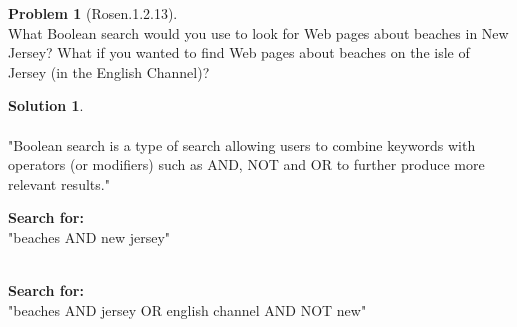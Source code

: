 \documentclass{article}
\theoremstyle{definition}
\newtheorem*{problem}{Problem}
\newtheorem*{solution}{Solution}
\begin{document}
\begin{problem}[Rosen.1.2.13]\ \\
What Boolean search would you use to look for Web
pages about beaches in New Jersey? What if you wanted
to find Web pages about beaches on the isle of Jersey (in
the English Channel)?
\begin{compactenum}
\renewcommand{\theenumi}{\alph{enumi}}

\end{compactenum}
\end{problem}

\begin{solution}\ \\
\ \\
"Boolean search is a type of search allowing users to combine keywords with operators (or modifiers) such as AND, NOT and OR to further produce more relevant results."\ \\

\begin{compactenum}
\renewcommand{\theenumi}{\alph{enumi}}
\item
\textbf{Search for:}\ \\
"beaches AND new jersey"\ \\
\ \\
\item
\textbf{Search for:}\ \\
"beaches AND jersey  OR english channel AND NOT new"

\end{compactenum}
\end{solution}
\end{document}
